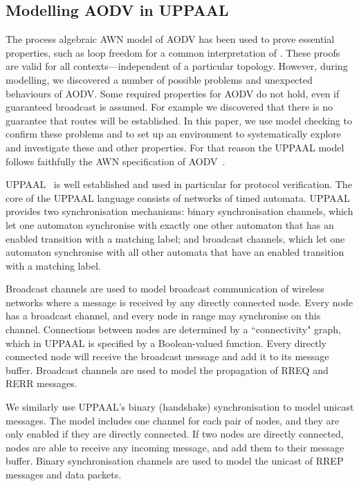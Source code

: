 \documentclass[conference,twoside]{IEEEtran}
\newcommand{\awn}{AWN\xspace}
\begin{document}
\subsection{Modelling AODV in UPPAAL}\label{uppaal}

The process algebraic \awn model of AODV has been used to prove
essential properties, such as loop freedom for a common interpretation
of \cite{rfc3561}. These proofs are valid for
all contexts---independent of a particular topology. However,
during modelling, we discovered a number of possible problems and
unexpected behaviours of AODV. Some required properties for AODV do
not hold, even if guaranteed broadcast is assumed.  For example we
discovered that there is no guarantee that routes will be
established. In this paper, we use model checking to
confirm these problems and to set up an environment to systematically explore and investigate these and other properties. For that reason the UPPAAL model follows faithfully the \awn specification of AODV~\cite{TR11}.

UPPAAL~\cite{uppaal04,LPY97}  is well established and used in particular for protocol verification.
The core of the UPPAAL language consists of networks of timed automata. UPPAAL
provides two synchronisation mechanisms: binary synchronisation channels, which let one automaton synchronise with exactly one other automaton that has an enabled transition with a matching label; and broadcast channels, which let one automaton synchronise with all other automata that have an enabled transition with a matching label.

Broadcast channels are used to model broadcast communication of wireless networks where a message is received by any directly connected node. Every node has a broadcast channel, and every node in range may synchronise on this channel. Connections between nodes are determined by a  ``connectivity" graph, which in UPPAAL is specified by a Boolean-valued function. Every directly connected node  will receive the broadcast message and add it to its message buffer. Broadcast channels are used to model the propagation of {RREQ} and {RERR} messages.

We similarly use UPPAAL's binary (handshake) synchronisation to model
unicast messages. The model includes one channel for each pair of
nodes, and they are only enabled if they are directly connected. If
two nodes are directly connected, nodes are able to receive any
incoming message, and add them to their message buffer. Binary
synchronisation channels are used to model the unicast of  RREP messages and data packets.
\end{document}
